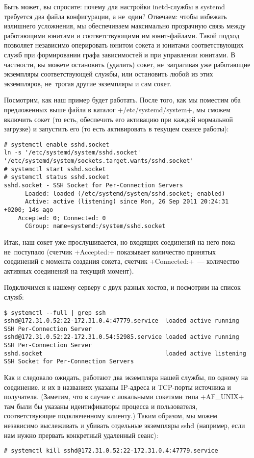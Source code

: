 \documentclass[10pt,oneside,a4paper]{article}
\begin{document}
Быть может, вы спросите: почему для настройки inetd-службы в systemd требуется
два файла конфигурации, а не~один? Отвечаем: чтобы избежать излишнего
усложнения, мы обеспечиваем максимально прозрачную связь между работающими
юнитами и соответствующими им юнит-файлами. Такой подход позволяет независимо
оперировать юнитом сокета и юнитами соответствующих служб при формировании графа
зависимостей и при управлении юнитами. В частности, вы можете остановить
(удалить) сокет, не~затрагивая уже работающие экземпляры соответствующей службы,
или остановить любой из этих экземпляров, не~трогая другие экземпляры и сам
сокет.

Посмотрим, как наш пример будет работать. После того, как мы поместим оба
предложенных выше файла в каталог +/etc/systemd/system+, мы сможем включить
сокет (то есть, обеспечить его активацию при каждой нормальной загрузке) и
запустить его (то есть активировать в текущем сеансе работы):

\begin{Verbatim}
# systemctl enable sshd.socket
ln -s '/etc/systemd/system/sshd.socket' '/etc/systemd/system/sockets.target.wants/sshd.socket'
# systemctl start sshd.socket
# systemctl status sshd.socket
sshd.socket - SSH Socket for Per-Connection Servers
	  Loaded: loaded (/etc/systemd/system/sshd.socket; enabled)
	  Active: active (listening) since Mon, 26 Sep 2011 20:24:31 +0200; 14s ago
	Accepted: 0; Connected: 0
	  CGroup: name=systemd:/system/sshd.socket
\end{Verbatim}

Итак, наш сокет уже прослушивается, но входящих соединений на него пока
не~поступало (счетчик +Accepted:+ показывает количество принятых соединений
с момента создания сокета, счетчик +Connected:+~--- количество активных
соединений на текущий момент).

Подключимся к нашему серверу с двух разных хостов, и посмотрим на список служб:
\begin{Verbatim}[fontsize=\small]
$ systemctl --full | grep ssh
sshd@172.31.0.52:22-172.31.0.4:47779.service  loaded active running       SSH Per-Connection Server
sshd@172.31.0.52:22-172.31.0.54:52985.service loaded active running       SSH Per-Connection Server
sshd.socket                                   loaded active listening     SSH Socket for Per-Connection Servers
\end{Verbatim}

Как и следовало ожидать, работают два экземпляра нашей службы, по одному на
соединение, и их в названиях указаны IP-адреса и TCP-порты источника и
получателя. (Заметим, что в случае с локальными сокетами типа +AF_UNIX+ там были
бы указаны идентификаторы процесса и пользователя, соответствующие подключенному
клиенту.) Таким образом, мы можем независимо выслеживать и убивать отдельные
экземпляры sshd (например, если нам нужно прервать конкретный удаленный сеанс):
\begin{Verbatim}
# systemctl kill sshd@172.31.0.52:22-172.31.0.4:47779.service
\end{Verbatim}
\end{document}
